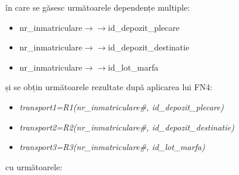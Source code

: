 \documentclass[12pt, a4paper]{article}
\begin{document}
\begin{table}[!htbp]
\begin{center}
    \caption{Relația \emph{transport}}\label{tab14}
\end{center}
\end{table}

în care se găsesc următoarele dependențe multiple:

\begin{itemize}
    \item nr\_inmatriculare$\rightarrow\rightarrow$id\_depozit\_plecare
    \item nr\_inmatriculare$\rightarrow\rightarrow$id\_depozit\_destinatie
    \item nr\_inmatriculare$\rightarrow\rightarrow$id\_lot\_marfa
\end{itemize}

și se obțin următoarele rezultate după aplicarea lui FN4:

\begin{itemize}
    \item \emph{transport1=R1(nr\_inmatriculare\#, id\_depozit\_plecare)}
    \item \emph{transport2=R2(nr\_inmatriculare\#, id\_depozit\_destinatie)}
    \item \emph{transport3=R3(nr\_inmatriculare\#, id\_lot\_marfa)}
\end{itemize}

cu următoarele:

\begin{table}[!htbp]
\begin{center}
    \caption{Relația \emph{transport1}}\label{tab14-1}
\end{center}
\end{table}
\end{document}
